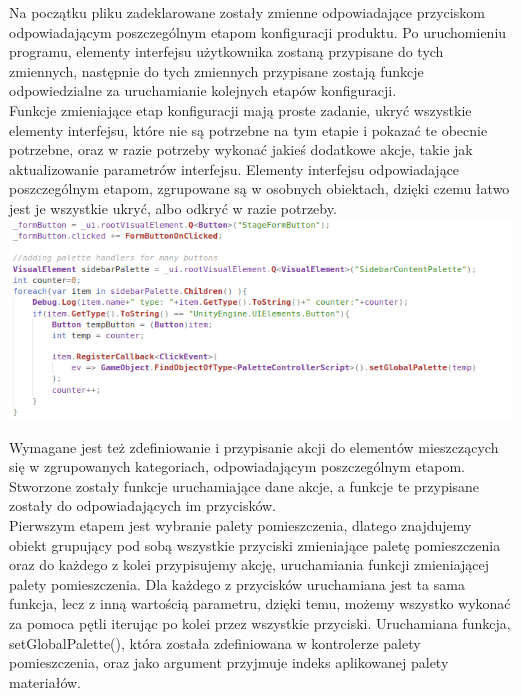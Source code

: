 \documentclass{article} %
\begin{document}
            Na początku pliku zadeklarowane zostały zmienne odpowiadające przyciskom odpowiadającym poszczególnym etapom konfiguracji produktu. Po uruchomieniu programu, elementy interfejsu użytkownika zostaną przypisane do tych zmiennych, następnie do tych zmiennych przypisane zostają funkcje odpowiedzialne za uruchamianie kolejnych etapów konfiguracji.
            \\
            
            Funkcje zmieniające etap konfiguracji mają proste zadanie, ukryć wszystkie elementy interfejsu, które nie są potrzebne na tym etapie i pokazać te obecnie potrzebne, oraz w razie potrzeby wykonać jakieś dodatkowe akcje, takie jak aktualizowanie parametrów interfejsu. Elementy interfejsu odpowiadające poszczególnym etapom, zgrupowane są w osobnych obiektach, dzięki czemu łatwo jest je wszystkie ukryć, albo odkryć w razie potrzeby.
            \\
            
            \includegraphics[bb=0 0 691 275,scale=0.7,keepaspectratio=true]{images/screenshots/code/code_003.png}

            
            Wymagane jest też zdefiniowanie i przypisanie akcji do elementów mieszczących się w zgrupowanych kategoriach, odpowiadającym poszczególnym etapom. Stworzone zostały funkcje uruchamiające dane akcje, a funkcje te przypisane zostały do odpowiadających im przycisków. 
            \\
            
            Pierwszym etapem jest wybranie palety pomieszczenia, dlatego znajdujemy obiekt grupujący pod sobą wszystkie przyciski zmieniające paletę pomieszczenia oraz do każdego z kolei przypisujemy akcję, uruchamiania funkcji zmieniającej palety pomieszczenia. Dla każdego z przycisków uruchamiana jest ta sama funkcja, lecz z inną wartością parametru, dzięki temu, możemy wszystko wykonać za pomoca pętli iterując po kolei przez wszystkie przyciski. Uruchamiana funkcja, setGlobalPalette(), która została zdefiniowana w kontrolerze palety pomieszczenia, oraz jako argument przyjmuje indeks aplikowanej palety materiałów.
            \\
            
\end{document}
